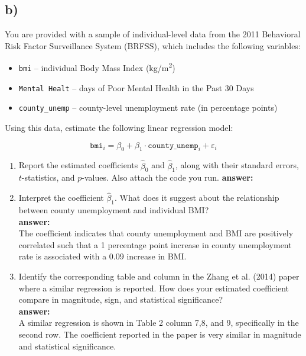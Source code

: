 \documentclass[12pt]{article}
\begin{document}
\subsection*{b)}

You are provided with a sample of individual-level data from the 2011 Behavioral Risk Factor Surveillance System (BRFSS), which includes the following variables:

\begin{itemize}
    \item \texttt{bmi} -- individual Body Mass Index (kg/m\textsuperscript{2})
    \item \texttt{Mental Healt} -- days of Poor Mental Health in the Past 30 Days
    \item \texttt{county\_unemp} -- county-level unemployment rate (in percentage points)
\end{itemize}

\vspace{0.3cm}

Using this data, estimate the following linear regression model:

\[
\texttt{bmi}_i = \beta_0 + \beta_1 \cdot \texttt{county\_unemp}_i + \varepsilon_i
\]

\begin{enumerate}
    \item Report the estimated coefficients $\hat\beta_0$ and $\hat\beta_1$, along with their standard errors, $t$-statistics, and $p$-values. Also attach the code you run.
    \textbf{answer:}
    

    \item Interpret the coefficient $\hat\beta_1$. What does it suggest about the relationship between county unemployment and individual BMI?\\
    \textbf{answer:}\\
    The coefficient indicates that county unemployment and BMI are positively correlated such that a 1 percentage point increase in county unemployment rate is associated with a 0.09 increase in BMI.

    \item Identify the corresponding table and column in the Zhang et al. (2014) paper where a similar regression is reported. How does your estimated coefficient compare in magnitude, sign, and statistical significance?\\
    \textbf{answer:}\\
    A similar regression is shown in Table 2 column 7,8, and 9, specifically in the second row. The coefficient reported in the paper is very similar in magnitude and statistical significance.
    
\end{enumerate}
\end{document}
